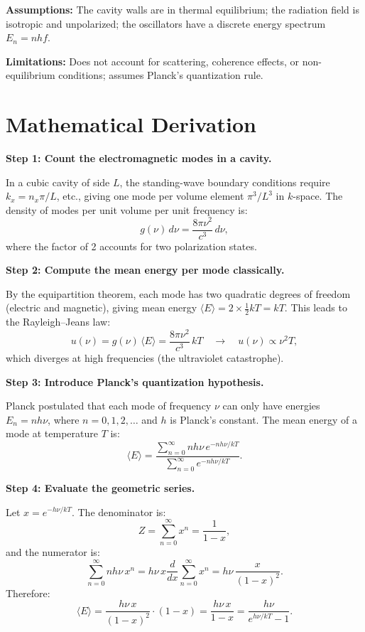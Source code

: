 \textbf{Assumptions:} The cavity walls are in thermal equilibrium; the radiation field is isotropic and unpolarized; the oscillators have a discrete energy spectrum $E_{n} = nhf$.


\textbf{Limitations:} Does not account for scattering, coherence effects, or non-equilibrium conditions; assumes Planck's quantization rule.


\section*{Mathematical Derivation}

\textbf{Step 1: Count the electromagnetic modes in a cavity.}

In a cubic cavity of side $L$, the standing-wave boundary conditions require $k_x = n_x\pi/L$, etc., giving one mode per volume element $\pi^{3}/L^{3}$ in $k$-space. The density of modes per unit volume per unit frequency is:
\begin{equation}
g(\nu)\,d\nu = \frac{8\pi\nu^{2}}{c^{3}}\,d\nu,
\end{equation}
where the factor of 2 accounts for two polarization states.

\textbf{Step 2: Compute the mean energy per mode classically.}

By the equipartition theorem, each mode has two quadratic degrees of freedom (electric and magnetic), giving mean energy $\langle E \rangle = 2 \times \frac{1}{2}kT = kT$. This leads to the Rayleigh--Jeans law:
\begin{equation}
u(\nu) = g(\nu)\,\langle E\rangle = \frac{8\pi\nu^{2}}{c^{3}}\,kT \quad\longrightarrow\quad u(\nu) \propto \nu^{2}T,
\end{equation}
which diverges at high frequencies (the ultraviolet catastrophe).

\textbf{Step 3: Introduce Planck's quantization hypothesis.}

Planck postulated that each mode of frequency $\nu$ can only have energies $E_n = nh\nu$, where $n = 0, 1, 2, \ldots$ and $h$ is Planck's constant. The mean energy of a mode at temperature $T$ is:
\begin{equation}
\langle E \rangle = \frac{\sum_{n=0}^{\infty} nh\nu\,e^{-nh\nu/kT}}{\sum_{n=0}^{\infty} e^{-nh\nu/kT}}.
\end{equation}

\textbf{Step 4: Evaluate the geometric series.}

Let $x = e^{-h\nu/kT}$. The denominator is:
\begin{equation}
Z = \sum_{n=0}^{\infty} x^{n} = \frac{1}{1-x},
\end{equation}
and the numerator is:
\begin{equation}
\sum_{n=0}^{\infty} nh\nu\,x^{n} = h\nu\,x\frac{d}{dx}\sum_{n=0}^{\infty} x^{n} = h\nu\,\frac{x}{(1-x)^{2}}.
\end{equation}
Therefore:
\begin{equation}
\langle E \rangle = \frac{h\nu\,x}{(1-x)^{2}}\cdot(1-x) = \frac{h\nu\,x}{1-x} = \frac{h\nu}{e^{h\nu/kT}-1}.
\end{equation}

